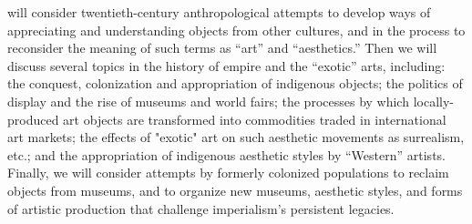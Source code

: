\begin{description}
        will consider twentieth-century anthropological attempts to develop ways
        of appreciating and understanding objects from other cultures, and in
        the process to reconsider the meaning of such terms as ``art'' and
        ``aesthetics.'' Then we will discuss several topics in the history of
        empire and the ``exotic'' arts, including: the conquest, colonization
        and appropriation of indigenous objects; the politics of display and the
        rise of museums and world fairs; the processes by which locally-produced
        art objects are transformed into commodities traded in international art
        markets; the effects of "exotic" art on such aesthetic movements as
        surrealism, etc.; and the appropriation of indigenous aesthetic styles
        by ``Western'' artists. Finally, we will consider attempts by formerly
        colonized populations to reclaim objects from museums, and to organize
        new museums, aesthetic styles, and forms of artistic production that
        challenge imperialism's persistent legacies.
\end{description}

